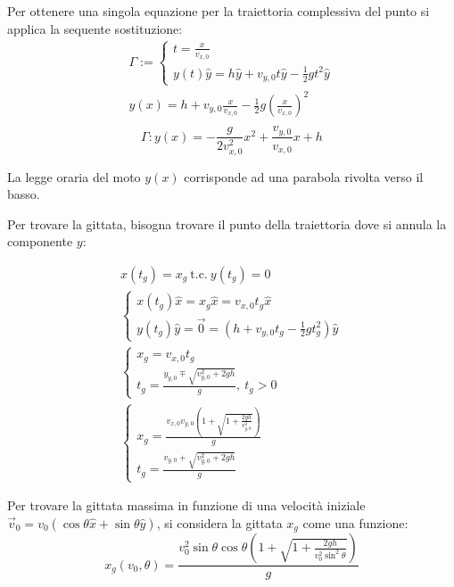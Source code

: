 \documentclass{article}
\numberwithin{equation}{subsection}
\begin{document}
Per ottenere una singola equazione per la traiettoria complessiva 
del punto si applica la sequente sostituzione:
\begin{gather*}
    \Gamma:=
    \begin{cases}
        \displaystyle t = \frac{x}{v_{x,0}}\\
        {y}(t)\hat{y}=h\hat{y}+v_{y,0}t\hat{y}-\displaystyle\frac{1}{2}gt^{2}\hat{y}
    \end{cases}\\
    \displaystyle y(x)=h+v_{y,0}\frac{x}{v_{x,0}}-\frac{1}{2}g\left(\frac{x}{v_{x,0}}\right)^{2}\\
\end{gather*}
\begin{equation}
    \Gamma:y(x)\displaystyle=-\frac{g}{2v_{x,0}^{2}}x^{2}+\frac{v_{y,0}}{v_{x,0}}x+h
\end{equation}

La legge oraria del moto $y(x)$ corrisponde ad una parabola rivolta verso 
il basso.



Per trovare la gittata, bisogna trovare il punto della traiettoria 
dove si annula la componente $y$:

\begin{gather*}
    x(t_g)=x_g \:\mbox{t.c.}\:y(t_g)=0\\
    \begin{cases}
        x(t_g)\hat{x}=x_g\hat{x}=v_{x,0}t_g\hat{x}\\
        y(t_g)\hat{y}=\vec{0}=\left(h+v_{y,0}t_g-\displaystyle\frac{1}{2}gt_g^{2}\right)\hat{y}
    \end{cases}\\
    \begin{cases}
        x_g=v_{x,0}t_g\\
        t_g=\displaystyle\frac{y_{y,0}\mp\sqrt{v_{y,0}^{2}+2gh}}{g}{,}\:t_g>0  
    \end{cases}\\
    \begin{cases}
        x_g=\displaystyle\frac{v_{x,0}v_{y,0}\left(1+\sqrt{1+\displaystyle\frac{2gh}{v_{y,0}^2}}\right)}{g}\\
        t_g=\displaystyle\frac{v_{y,0}+\sqrt{v_{y,0}^{2}+2gh}}{g}    
    \end{cases}
\end{gather*}

Per trovare la gittata massima in funzione di una velocità 
iniziale $\vec{v}_0 = v_0(\cos\theta\hat{x}+\sin\theta\hat{y})$, 
si considera la gittata $x_g$ come una funzione:
\begin{equation}
    x_g(v_0,\theta)=\displaystyle\frac{v_0^{2}\sin\theta \cos\theta\left(1+\sqrt{1+\displaystyle\frac{2gh}{v_0^2\sin^2\theta}}\right)}{g}
\end{equation}
\end{document}
